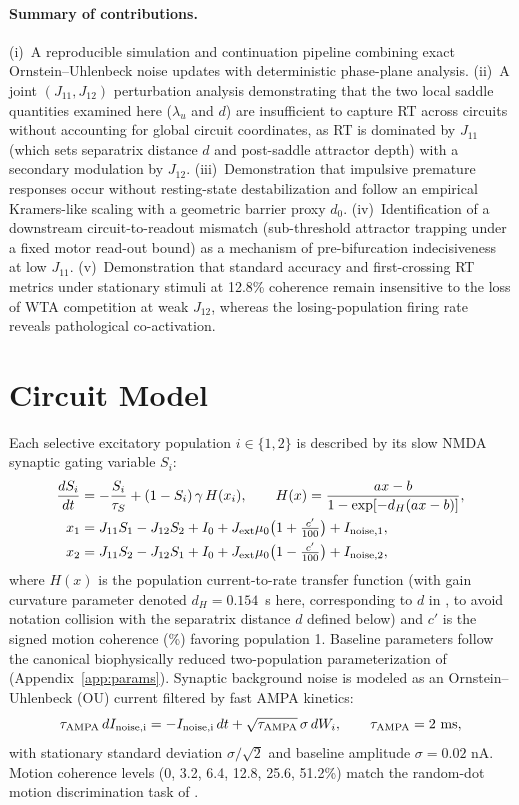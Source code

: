 \documentclass[11pt]{article}
\begin{document}
	\paragraph{Summary of contributions.} (i)~A reproducible simulation and continuation pipeline combining exact Ornstein--Uhlenbeck noise updates with deterministic phase-plane analysis. (ii)~A joint $(J_{11},J_{12})$ perturbation analysis demonstrating that the two local saddle quantities examined here ($\lambda_u$ and $d$) are insufficient to capture RT across circuits without accounting for global circuit coordinates, as RT is dominated by $J_{11}$ (which sets separatrix distance $d$ and post-saddle attractor depth) with a secondary modulation by $J_{12}$. (iii)~Demonstration that impulsive premature responses occur without resting-state destabilization and follow an empirical Kramers-like scaling with a geometric barrier proxy $d_0$. (iv)~Identification of a downstream circuit-to-readout mismatch (sub-threshold attractor trapping under a fixed motor read-out bound) as a mechanism of pre-bifurcation indecisiveness at low $J_{11}$. (v)~Demonstration that standard accuracy and first-crossing RT metrics under stationary stimuli at 12.8\% coherence remain insensitive to the loss of WTA competition at weak $J_{12}$, whereas the losing-population firing rate reveals pathological co-activation.
	
	\section{Circuit Model}
	Each selective excitatory population $i\in\{1,2\}$ is described by its slow NMDA synaptic gating variable $S_i$:
	\begin{align}
		\frac{dS_i}{dt} &= -\frac{S_i}{\tau_S}+(1-S_i)\,\gamma\,H(x_i), \qquad H(x)=\frac{ax-b}{1-\exp[-d_H(ax-b)]},\\
		x_1 &= J_{11}S_1-J_{12}S_2+I_0+J_{\rm ext}\mu_0\bigl(1+\tfrac{c'}{100}\bigr)+I_{\rm noise,1},\\
		x_2 &= J_{11}S_2-J_{12}S_1+I_0+J_{\rm ext}\mu_0\bigl(1-\tfrac{c'}{100}\bigr)+I_{\rm noise,2},
	\end{align}
	where $H(x)$ is the population current-to-rate transfer function (with gain curvature parameter denoted $d_H=0.154$~s here, corresponding to $d$ in \citealp{WongWang2006}, to avoid notation collision with the separatrix distance $d$ defined below) and $c'$ is the signed motion coherence (\%) favoring population 1. Baseline parameters follow the canonical biophysically reduced two-population parameterization of \citet{WongWang2006} (Appendix~\ref{app:params}). Synaptic background noise is modeled as an Ornstein--Uhlenbeck (OU) current filtered by fast AMPA kinetics:
	\begin{equation}
		\tau_{\rm AMPA}\,dI_{\rm noise,i}=-I_{\rm noise,i}\,dt+\sqrt{\tau_{\rm AMPA}}\,\sigma\,dW_i,\qquad \tau_{\rm AMPA}=2\ \text{ms},
	\end{equation}
	with stationary standard deviation $\sigma/\sqrt2$ and baseline amplitude $\sigma=0.02$ nA. Motion coherence levels (0, 3.2, 6.4, 12.8, 25.6, 51.2\%) match the random-dot motion discrimination task of \citet{RoitmanShadlen2002}.
	
\end{document}
